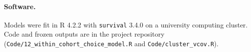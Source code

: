 \paragraph{Software.}
Models were fit in R 4.2.2 with \texttt{survival} 3.4.0 on a university computing cluster. Code and frozen outputs are in the project repository (\texttt{Code/12\_within\_cohort\_choice\_model.R} and \texttt{Code/cluster\_vcov.R}).

